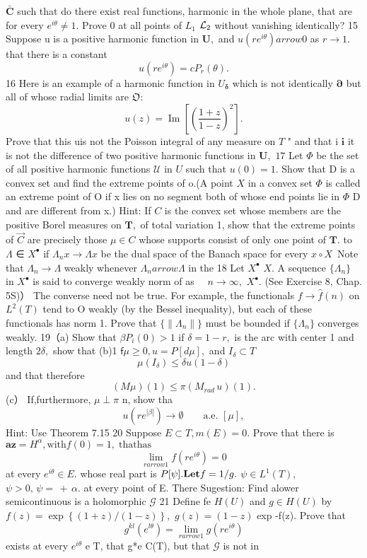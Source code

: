 $\textstyle{\bar{\mathbf{C}}}$ such that do there exist real functions, harmonic in the whole plane, that are for every $e^{i\theta}\neq1.$ Prove 0 at all points of $L_{\mathrm{1}}$ ${\cal L}_{2}$ without vanishing identically? 15 Suppose u is a positive harmonic function in ${\boldsymbol{U}},$ and $u(r e^{i\theta}) arrow0$ as $r\to1.$ that there is a constant $$ u(r e^{i\theta})=c P_{r}(\theta). $$ 16 Here is an example of a harmonic function in $U_{\mathbf{\delta}}$ which is not identically $\mathbf{\partial}$ but all of whose radial limits are ${\mathfrak{O}}\colon$ $$ u(z)=\operatorname{Im}\left[\left({\frac{1+z}{1-z}}\right)^{2}\right]. $$ Prove that this uis not the Poisson integral of any measure on ${\mathbf{}}T$ " and that i $\mathbf{i}$ it is not the difference of two positive harmonic functions in ${\boldsymbol{U}},$ $17$ Let $\Phi$ be the set of all positive harmonic functions ${\mathcal{U}}$ in $\boldsymbol{\mathit{U}}$ such that $u(0)=1.$ Show that D is a convex set and find the extreme points of o.(A point $\textstyle X$ in a convex set $\Phi$ is called an extreme point of O if x lies on no segment both of whose end points lie in $\Phi$ D and are different from x.) Hint: If ${\mathbf{}}C$ is the convex set whose members are the positive Borel measures on ${\boldsymbol{T}},$ of total variation 1, show that the extreme points of $\scriptstyle{\vec{C}}$ are precisely those $\mu\in C$ whose supports consist of only one point of ${\boldsymbol{T}}.$ to $\Lambda$ ∈ $X^{\bullet}$ if $\Lambda_{n}x\to\Lambda x$ be the dual space of the Banach space for every $\scriptstyle x\circ X\,$ Note that $\Lambda_{n}\to\Lambda$ weakly whenever $\Lambda_{n} arrow\Lambda$ in the 18 Let $X^{\bullet}$ $X.$ A sequence $\{\Lambda_{n}\}$ in $X^{\bullet}$ is said to converge weakly norm of as $\quad n\to\infty,$ $X^{\bullet}.$ (See Exercise 8, Chap. 5S)） The converse need not be true. For example, the functionals $f\to{\hat{f}}(n)$ on $L^{2}(T)$ tend to O weakly (by the Bessel inequality), but each of these functionals has norm 1. Prove that $\{\|\Lambda_{n}\|\}$ must be bounded if $\{\Lambda_{n}\}$ converges weakly. 19（a) Show that $\beta P_{i}(0)>1$ if $\delta=1-r,$ is the arc with center 1 and length $2\delta,$ show that (b)1 ${\textsf{f}}\mu\geq0,u=P[d\mu],$ and $I_{\delta}\subset T$ $$ \mu(I_{\delta})\leq\delta u(1-\delta) $$ and that therefore $$ (M\mu)(1)\leq\pi(M_{r a d}\,u)(1). $$ (c） If,furthermore, $\mu\perp\pi$ n, show tha $$ u(r e^{|\beta|})\to\emptyset\qquad\mathrm{a.e.}\,\,[\mu], $$ Hint: Use Theorem 7.15 20 Suppose $E\subset T,m(E)=0.$ Prove that there is $\mathbf{a}\mathbf{z}=H^{\alpha},{\mathrm{with}}f(0)=1,\operatorname{thathas}$ $$ \operatorname*{lim}_{r arrow1}f(r e^{i\theta})=0 $$ at every $e^{i\theta}\in E.$ whose real part is $P[\psi].{\bf L e t}f=1/g.$ $\psi\in L^{1}(T),$ $\psi>0,\,\psi=\,+\,\alpha.$ at every point of E. There Sugestion: Find alower semicontinuous is a holomorphic $\scriptstyle{\mathcal{G}}$ 21 Define fe $H(U)$ and $g\in H(U)$ by $f(z)=\exp{\left\{(1+z)/(1-z)\right\}},$ $g(z)=(1-z)$ exp {-f(z)}. Prove that $$ g^{k l}(e^{l\theta})=\operatorname*{lim}_{r arrow1}g(r e^{i\theta}) $$ exists at every $e^{i\theta}$ e T, that g*e C(T), but that $\scriptstyle{\mathcal{G}}$ is not in 